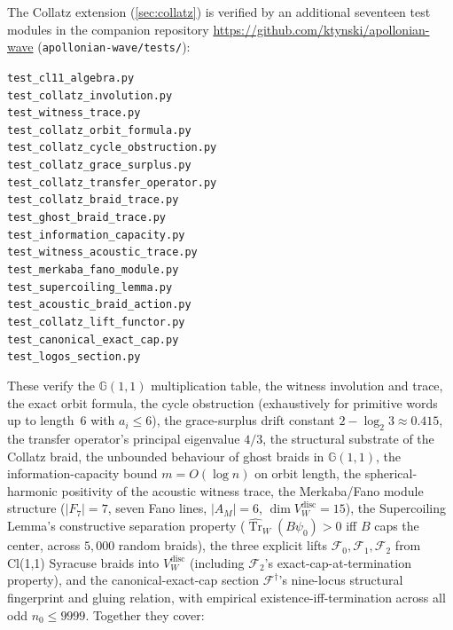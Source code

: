 \documentclass[11pt,a4paper]{article}
\theoremstyle{plain}
\theoremstyle{definition}
\theoremstyle{remark}
\numberwithin{equation}{section}
\newcommand{\Cl}{\mathbb{G}}
\DeclareMathOperator{\Tr}{Tr}
\begin{document}
The Collatz extension (\cref{sec:collatz}) is verified by an
additional seventeen test modules in the companion repository
\url{https://github.com/ktynski/apollonian-wave}
(\texttt{apollonian-wave/tests/}):
\begin{center}
\begin{minipage}{0.78\linewidth}
\small
\texttt{test\_cl11\_algebra.py}\\
\texttt{test\_collatz\_involution.py}\\
\texttt{test\_witness\_trace.py}\\
\texttt{test\_collatz\_orbit\_formula.py}\\
\texttt{test\_collatz\_cycle\_obstruction.py}\\
\texttt{test\_collatz\_grace\_surplus.py}\\
\texttt{test\_collatz\_transfer\_operator.py}\\
\texttt{test\_collatz\_braid\_trace.py}\\
\texttt{test\_ghost\_braid\_trace.py}\\
\texttt{test\_information\_capacity.py}\\
\texttt{test\_witness\_acoustic\_trace.py}\\
\texttt{test\_merkaba\_fano\_module.py}\\
\texttt{test\_supercoiling\_lemma.py}\\
\texttt{test\_acoustic\_braid\_action.py}\\
\texttt{test\_collatz\_lift\_functor.py}\\
\texttt{test\_canonical\_exact\_cap.py}\\
\texttt{test\_logos\_section.py}
\end{minipage}
\end{center}
These verify the $\Cl(1,1)$ multiplication table, the witness
involution and trace, the exact orbit formula, the cycle
obstruction (exhaustively for primitive words up to length~$6$ with
$a_i\le6$), the grace-surplus drift constant
$2-\log_2 3\approx0.415$, the transfer operator's principal
eigenvalue $4/3$, the structural substrate of the Collatz braid,
the unbounded behaviour of ghost braids in $\Cl(1,1)$, the
information-capacity bound $m=O(\log n)$ on orbit length, the
spherical-harmonic positivity of the acoustic witness trace, the
Merkaba/Fano module structure ($|F_7|=7$, seven Fano lines,
$|A_M|=6$, $\dim V_W^{\mathrm{disc}}=15$), the Supercoiling
Lemma's constructive separation property
($\widehat{\Tr}_W(B\psi_0)>0$ iff $B$ caps the center, across
$5{,}000$ random braids), the three explicit lifts
$\mathcal{F}_0,\mathcal{F}_1,\mathcal{F}_2$ from Cl(1,1) Syracuse
braids into $V_W^{\mathrm{disc}}$ (including
$\mathcal{F}_2$'s exact-cap-at-termination property), and the
canonical-exact-cap section $\mathcal{F}^{\dagger}$'s nine-locus
structural fingerprint and gluing relation, with empirical
existence-iff-termination across all odd $n_0\le 9999$.
Together they cover:
\end{document}
